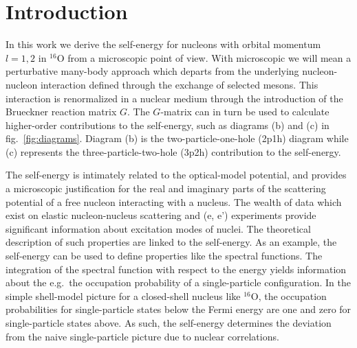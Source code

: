 

\clearpage

\section{Introduction}

In this work we derive the self-energy for nucleons with
orbital momentum $l=1,2$ in $^{16}$O from a microscopic point 
of view. With microscopic we will mean a perturbative
many-body  approach which departs from the underlying
nucleon-nucleon interaction defined through the exchange of 
selected mesons. This interaction is renormalized in a
nuclear medium through the introduction of the Brueckner reaction matrix
$G$. The $G$-matrix can in turn be used to calculate
higher-order contributions to the self-energy, such as diagrams
(b) and (c) in fig.\ \ref{fig:diagrams}. Diagram (b) is the 
two-particle-one-hole (2p1h) diagram while (c) represents the
three-particle-two-hole (3p2h) contribution to the self-energy.

The self-energy is intimately related to the optical-model
potential, and provides a microscopic justification 
for the real and imaginary parts of the scattering potential of a free
nucleon interacting with a nucleus. The wealth of data which exist 
on elastic nucleon-nucleus scattering and (e, e') experiments
provide significant information about excitation modes of nuclei. The 
theoretical description of such properties are linked to the self-energy.
As an example, 
the self-energy can be used to define properties like the 
spectral functions.
The integration of the spectral function with respect to the energy yields
information about the e.g.\ the occupation probability of a single-particle
configuration. In the simple
shell-model picture for a closed-shell nucleus like $^{16}$O, the
occupation probabilities for single-particle states below the Fermi energy
are one and zero for single-particle states above. 
As such, the self-energy determines the deviation from the
naive single-particle picture due to nuclear correlations. 



